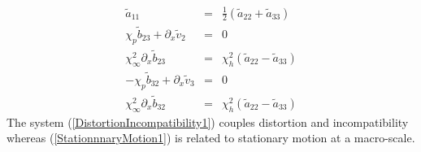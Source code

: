 \documentclass[
10pt, %
a4paper, %
oneside, %
headinclude,footinclude, %
table
]{scrartcl}
\begin{document}
\begin{itemize}
\begin{equation}
\begin{array}{rcl}
\tilde{a}_{11}&=&\frac{1}{2}\left(\tilde{a}_{22}+\tilde{a}_{33}\right)  \\[6pt]
 \chi_p \tilde{b}_{23}+\partial_{x}\tilde{v}_2&=&0 \\
\chi _{\infty }^2\partial_{x}\tilde{b}_{23} &=&\chi _h^2 \left(\tilde{a}_{22}-\tilde{a}_{33}\right)\\[6pt]
-\chi_p \tilde{b}_{32}+\partial_{x}\tilde{v}_3&=&0 \\
\chi _{\infty }^2\partial_{x}\tilde{b}_{32}&=&\chi _h^2 \left(\tilde{a}_{22}-\tilde{a}_{33}\right)
\end{array}
\end{equation}   
The system (\ref{DistortionIncompatibility1}) couples distortion and incompatibility whereas (\ref{StationnnaryMotion1}) is related to stationary motion at a macro-scale. 

\end{itemize}
\end{document}

